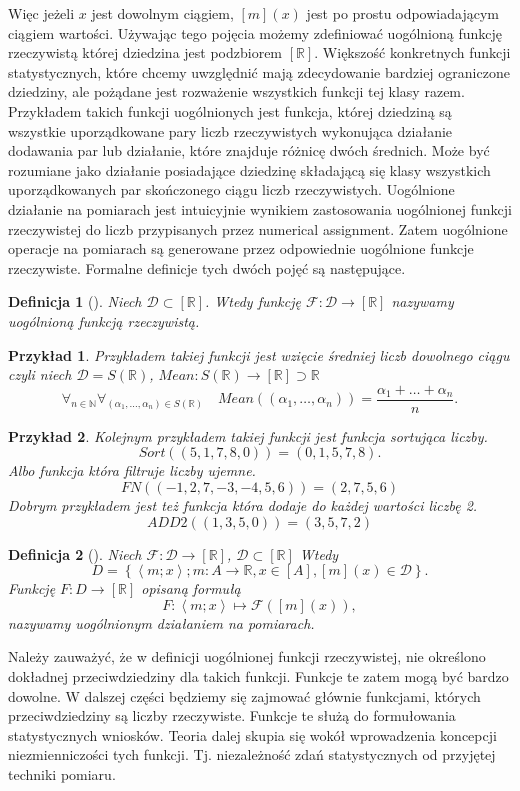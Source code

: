 \documentclass[12pt,a4paper]{report}
\newtheorem{definition}{Definicja}[chapter]
\newtheorem{przyklad}{Przykład}
\newcommand{\parauporzadkowana}[2]{\left\langle {#1}; {#2} \right\rangle}
\newcommand{\zbior}[1]{\left\lbrace {#1} \right\rbrace }
\newcommand{\domkniecie}[1]{\left[ {#1} \right] }
\begin{document}
Więc jeżeli $x$ jest dowolnym ciągiem, $\domkniecie{m}(x)$ jest po prostu odpowiadającym ciągiem wartości. Używając tego pojęcia możemy zdefiniować uogólnioną funkcję rzeczywistą której dziedzina jest podzbiorem $\domkniecie{\mathbb{R}}$. Większość konkretnych funkcji statystycznych, które chcemy uwzględnić mają zdecydowanie bardziej ograniczone dziedziny, ale pożądane jest rozważenie wszystkich funkcji tej klasy razem. Przykładem takich funkcji uogólnionych jest funkcja, której dziedziną są wszystkie uporządkowane pary liczb rzeczywistych wykonująca działanie dodawania par lub działanie, które znajduje różnicę dwóch średnich. Może być rozumiane jako działanie posiadające dziedzinę składającą się klasy wszystkich uporządkowanych par skończonego ciągu liczb rzeczywistych. Uogólnione działanie na pomiarach jest intuicyjnie wynikiem zastosowania uogólnionej funkcji rzeczywistej  do liczb przypisanych przez numerical assignment. Zatem uogólnione operacje na pomiarach są generowane przez odpowiednie uogólnione funkcje rzeczywiste. Formalne definicje tych dwóch pojęć są następujące.
\begin{definition}[{\citep[Def. 4.1]{adams1965theory}}]
Niech $\mathcal{D}\subset \domkniecie{\mathbb{R}}$. Wtedy funkcję $\mathcal{F}:\mathcal{D}\to \domkniecie{\mathbb{R}}$ nazywamy uogólnioną funkcją rzeczywistą.
\end{definition}
\begin{przyklad}
Przykładem takiej funkcji jest wzięcie średniej  liczb dowolnego ciągu czyli niech $\mathcal{D}=S(\mathbb{R})$, $Mean: S(\mathbb{R})\to \domkniecie{\mathbb{R}}\supset \mathbb{R}$
$$
\forall_{n \in \mathbb{N}} \forall_{(\alpha_1,\dots,\alpha_n)\in S(\mathbb{R})} \quad Mean((\alpha_1,\dots,\alpha_n))=\frac{\alpha_1+\dots+\alpha_n}{n}.
$$
\end{przyklad}
\begin{przyklad}
Kolejnym przykładem takiej funkcji jest funkcja sortująca liczby.
$$
Sort((5,1,7,8,0))=(0,1,5,7,8).
$$
Albo funkcja która filtruje liczby ujemne.
$$
FN((-1,2,7,-3,-4,5,6))=(2,7,5,6)
$$
Dobrym przykładem jest też funkcja która dodaje do każdej wartości liczbę 2.
$$
ADD2((1,3,5,0))=(3,5,7,2)
$$
\end{przyklad}
\begin{definition}[{\citep[Def. 4.2]{adams1965theory}}]
Niech $\mathcal{F}:\mathcal{D}\to \domkniecie{\mathbb{R}}$, $\mathcal{D}\subset\domkniecie{\mathbb{R}}$ Wtedy
$$
D=\zbior{\parauporzadkowana{m}{x}; m:A\to \mathbb{R}, x\in \domkniecie{A}, \domkniecie{m}(x)\in \mathcal{D}}.
$$
Funkcję $F:D\to\domkniecie{\mathbb{R}}$ opisaną formułą
$$
F:\parauporzadkowana{m}{x}\longmapsto\mathcal{F}(\domkniecie{m}(x)),
$$
nazywamy uogólnionym działaniem na pomiarach.
\end{definition}
Należy zauważyć, że w definicji uogólnionej funkcji rzeczywistej, nie określono dokładnej przeciwdziedziny dla takich funkcji. Funkcje te zatem mogą być bardzo dowolne. W dalszej części będziemy się zajmować głównie funkcjami, których przeciwdziedziny są liczby rzeczywiste.  Funkcje te służą do formułowania statystycznych wniosków. Teoria dalej skupia się wokół wprowadzenia koncepcji niezmienniczości tych funkcji. Tj. niezależność zdań statystycznych od przyjętej techniki pomiaru.
\end{document}
